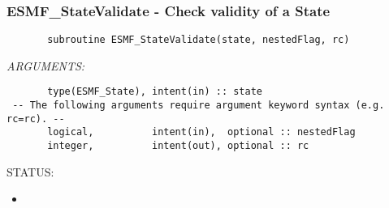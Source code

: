  
\setlength{\oldparskip}{\parskip}
\setlength{\parskip}{1.5ex}
\setlength{\oldparindent}{\parindent}
\setlength{\parindent}{0pt}
\setlength{\oldbaselineskip}{\baselineskip}
\setlength{\baselineskip}{11pt}
 
\def\bv{\begin{verbatim}}
\def\ev{\end{verbatim}}
\def\be{\begin{equation}}
\def\ee{\end{equation}}
\def\bea{\begin{eqnarray}}
\def\eea{\end{eqnarray}}
\def\bi{\begin{itemize}}
\def\ei{\end{itemize}}
\def\bn{\begin{enumerate}}
\def\en{\end{enumerate}}
\def\bd{\begin{description}}
\def\ed{\end{description}}
\def\({\left (}
\def\){\right )}
\def\[{\left [}
\def\]{\right ]}
\def\<{\left  \langle}
\def\>{\right \rangle}
\def\cI{{\cal I}}
\def\diag{\mathop{\rm diag}}
\def\tr{\mathop{\rm tr}}


 
\subsubsection [ESMF\_StateValidate] {ESMF\_StateValidate - Check validity of a State}


  
\begin{verbatim}       subroutine ESMF_StateValidate(state, nestedFlag, rc)\end{verbatim}{\em ARGUMENTS:}
\begin{verbatim}       type(ESMF_State), intent(in) :: state
 -- The following arguments require argument keyword syntax (e.g. rc=rc). --
       logical,          intent(in),  optional :: nestedFlag
       integer,          intent(out), optional :: rc \end{verbatim}
{\sf STATUS:}
   \begin{itemize}
   \item{}
   \end{itemize}
  
